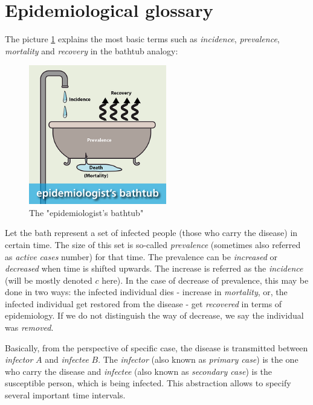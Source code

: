 \documentclass[
  digital, %
  oneside, %
  lof,     %
  lot,     %
]{fithesis4}
\begin{document}
\section{Epidemiological glossary}

The picture \ref{fig:epidemiologists-bathtub} explains the most basic
terms such as \textit{incidence}, \textit{prevalence}, \textit{mortality}
and \textit{recovery} in the bathtub analogy:

\begin{figure}[h]
  \begin{center}
    \includegraphics[width=6cm]{static/images/epidemiologists-bathtub.png}
  \end{center}
  \caption{The "epidemiologist's bathtub" \cite{arnold2020}}
  \label{fig:epidemiologists-bathtub}
\end{figure}

Let the bath represent a
set of infected people (those who carry the disease) in certain time.
The size of this set is so-called \textit{prevalence} (sometimes also referred 
as \textit{active cases} number) for that time.
The prevalence can be \textit{increased} or \textit{decreased} when time is shifted upwards.
The increase is referred as the \textit{incidence} (will be mostly denoted $c$ here).
In the case of decrease of prevalence, this may be done in two ways:
the infected individual dies - increase in \textit{mortality}, or, the
infected individual get restored from the disease - get 
\textit{recovered} in terms of epidemiology.
If we do not distinguish the way of decrease, we say the
individual was \textit{removed}.

Basically, from the perspective of specific case, the disease is
transmitted between \textit{infector} $A$ and \textit{infectee} $B$.
The \textit{infector} (also known as \textit{primary case}) is the one who carry the disease and
\textit{infectee} (also known as \textit{secondary case}) is the 
susceptible person, which is being infected.
This abstraction allows to specify several important time intervals.
\end{document}
